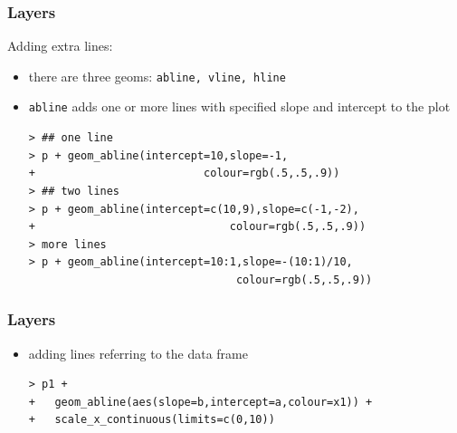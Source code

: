 \documentclass[xcolor={table},c]{beamer}
\begin{document}
\begin{frame}[fragile]\frametitle{Layers}
Adding extra lines:
  \begin{itemize}
  \item there are three geoms: \texttt{abline, vline, hline}
  \item \texttt{abline} adds one or more lines with specified slope and intercept to the plot\footnotesize
\begin{verbatim}
> ## one line
> p + geom_abline(intercept=10,slope=-1,
+                          colour=rgb(.5,.5,.9))
> ## two lines
> p + geom_abline(intercept=c(10,9),slope=c(-1,-2),
+                              colour=rgb(.5,.5,.9))
> more lines
> p + geom_abline(intercept=10:1,slope=-(10:1)/10,
                                colour=rgb(.5,.5,.9))
\end{verbatim}
  \end{itemize}
\begin{center}
\end{center}
\end{frame}

\begin{frame}[fragile]\frametitle{Layers}
  \begin{itemize}
  \item adding lines referring to the data frame
\begin{verbatim}
> p1 +
+   geom_abline(aes(slope=b,intercept=a,colour=x1)) + 
+   scale_x_continuous(limits=c(0,10)) 
\end{verbatim}
  \end{itemize}
\begin{center}
\end{center}
\end{frame}
\end{document}
